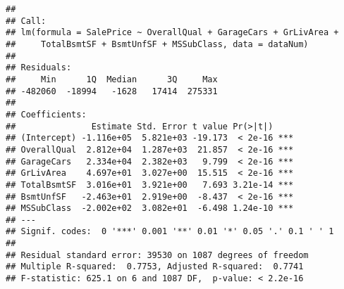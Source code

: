 \documentclass[]{article}
\begin{document}
\begin{verbatim}
## 
## Call:
## lm(formula = SalePrice ~ OverallQual + GarageCars + GrLivArea + 
##     TotalBsmtSF + BsmtUnfSF + MSSubClass, data = dataNum)
## 
## Residuals:
##     Min      1Q  Median      3Q     Max 
## -482060  -18994   -1628   17414  275331 
## 
## Coefficients:
##               Estimate Std. Error t value Pr(>|t|)    
## (Intercept) -1.116e+05  5.821e+03 -19.173  < 2e-16 ***
## OverallQual  2.812e+04  1.287e+03  21.857  < 2e-16 ***
## GarageCars   2.334e+04  2.382e+03   9.799  < 2e-16 ***
## GrLivArea    4.697e+01  3.027e+00  15.515  < 2e-16 ***
## TotalBsmtSF  3.016e+01  3.921e+00   7.693 3.21e-14 ***
## BsmtUnfSF   -2.463e+01  2.919e+00  -8.437  < 2e-16 ***
## MSSubClass  -2.002e+02  3.082e+01  -6.498 1.24e-10 ***
## ---
## Signif. codes:  0 '***' 0.001 '**' 0.01 '*' 0.05 '.' 0.1 ' ' 1
## 
## Residual standard error: 39530 on 1087 degrees of freedom
## Multiple R-squared:  0.7753, Adjusted R-squared:  0.7741 
## F-statistic: 625.1 on 6 and 1087 DF,  p-value: < 2.2e-16
\end{verbatim}
\end{document}
